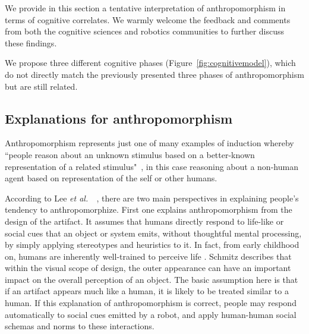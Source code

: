 \documentclass{sig-alternate-2013}
\newcommand{\etal}{{\textit{et al.~}}}
\begin{document}
We provide in this section a tentative interpretation of anthropomorphism in
terms of cognitive correlates. We warmly welcome the feedback and
comments from both the cognitive sciences and robotics communities to further
discuss these findings.

We propose three different cognitive phases (Figure~\ref{fig:cognitivemodel}),
which do not directly match the previously presented three phases of
anthropomorphism but are still related.


\subsection*{Explanations for anthropomorphism}

Anthropomorphism represents just one of many examples of induction whereby
``people reason about an unknown stimulus based on a better-known representation
of a related stimulus"~\cite{epley_when_2008}, in this case reasoning about a
non-human agent based on representation of the self or other humans.

According to Lee \etal~\cite{lee_human_2005}, there are two main perspectives in
explaining people's tendency to anthropomorphize. First one explains
anthropomorphism from the design of the artifact. It assumes that humans
directly respond to life-like or social cues that an object or system emits,
without thoughtful mental processing, by simply applying stereotypes and
heuristics to it. In fact, from early childhood on, humans are inherently
well-trained to perceive life \cite{epley_seeing_2007}. Schmitz
\cite{schmitz_concepts_2011} describes that within the visual scope of design,
the outer appearance can have an important impact on the overall perception of
an object. The basic assumption here is that if an artifact appears much like a
human, it is likely to be treated similar to a human. If this explanation of
anthropomorphism is correct, people may respond automatically to social cues
emitted by a robot, and apply human-human social schemas and norms to these
interactions.
\end{document}
